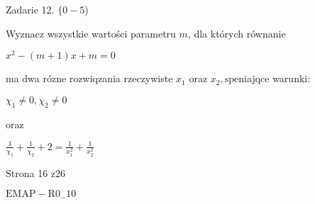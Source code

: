 \documentclass[a4paper,12pt]{article}
\begin{document}
Zadarie 12. $\{0-5$)

Wyznacz wszystkie wartości parametru $m$, dla których równanie

$x^{2}-(m+1)x+m=0$

ma dwa rózne rozwiqzania rzeczywiste $x_{1}$ oraz $x_{2}, \mathrm{s}\mathrm{p}\mathrm{e}$niajqce warunki:

$\chi_{1}\neq 0, \chi_{2}\neq 0$

oraz

$\displaystyle \frac{1}{\chi_{1}}+\frac{1}{\chi_{2}}+2=\frac{1}{x_{1}^{2}}+\frac{1}{x_{2}^{2}}$

Strona 16 z26

$\mathrm{E}\mathrm{M}\mathrm{A}\mathrm{P}-\mathrm{R}0_{-}10$
\end{document}
